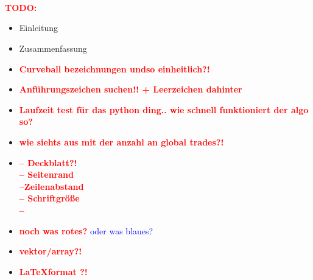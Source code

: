 \documentclass[a4paper, 11pt]{scrbook}
\theoremstyle{plain} %
\theoremstyle{definition} %
\newcommand{\cb}{Curveball}
\newcommand{\red}[1]{\textcolor{red}{\textbf{#1}}}
\newcommand{\blue}[1]{\textcolor{blue}{#1}}
\begin{document}
~\\
\\
\\
\newpage
\red{\Huge TODO:}
\begin{itemize}
	\item Einleitung
	\item Zusammenfassung
	\item \red{\Large \cb{} bezeichnungen undso einheitlich?!}
	\item \red{\Large Anführungszeichen suchen!! + Leerzeichen dahinter}
	\item \red{\huge Laufzeit test für das python ding.. wie schnell funktioniert der algo so?}
	\item \red{wie siehts aus mit der anzahl an global trades?!}
	\item \red{\Large -- Deckblatt?! \\ -- Seitenrand \\ --Zeilenabstand \\ -- Schriftgröße \\ --}
	\item \red{noch was rotes?} \blue{oder was blaues?}
	\item \red{vektor/array?!}
	\item \red{\LaTeX format ?!}
\end{itemize}













\listoffigures{}
\listoftables{}
\end{document}
